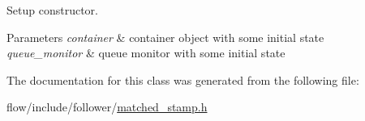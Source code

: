 Setup constructor. 


\begin{DoxyParams}{Parameters}
{\em container} & container object with some initial state \\
\hline
{\em queue\+\_\+monitor} & queue monitor with some initial state \\
\hline
\end{DoxyParams}


The documentation for this class was generated from the following file\+:\begin{DoxyCompactItemize}
\item 
flow/include/follower/\hyperlink{matched__stamp_8h}{matched\+\_\+stamp.\+h}\end{DoxyCompactItemize}
